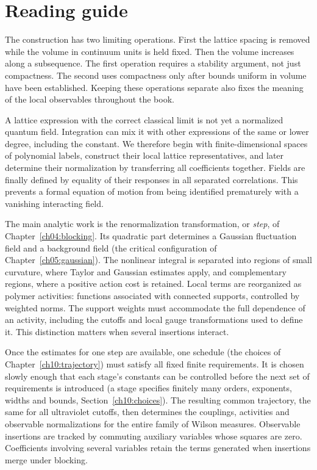 \chapter*{Reading guide}

The construction has two limiting operations. First the lattice spacing
is removed while the volume in continuum units is held fixed. Then the volume
increases along a subsequence. The first operation requires a stability
argument, not just compactness. The second uses compactness only after
bounds uniform in volume have been established. Keeping these operations
separate also fixes the meaning of the local observables throughout the
book.

A lattice expression with the correct classical limit is not yet a
normalized quantum field. Integration can mix it with other expressions
of the same or lower degree, including the constant. We therefore begin
with finite-dimensional spaces of polynomial labels, construct their
local lattice representatives, and later determine their normalization
by transferring all coefficients together. Fields are finally defined
by equality of their responses in all separated correlations. This prevents a
formal equation of motion from being identified prematurely with a
vanishing interacting field.

The main analytic work is the renormalization transformation, or \emph{step}, of Chapter~\ref{ch04:blocking}. Its quadratic part determines
a Gaussian fluctuation field and a background field (the critical configuration of Chapter~\ref{ch05:gaussian}). The nonlinear
integral is separated into regions of small curvature, where Taylor and
Gaussian estimates apply, and complementary regions, where a positive
action cost is retained. Local terms are reorganized as polymer
activities: functions associated with connected supports, controlled by
weighted norms. The support weights must accommodate the full dependence
of an activity, including the cutoffs and local gauge transformations used to
define it. This distinction matters when several insertions interact.

Once the estimates for one step are available, one schedule (the choices of Chapter~\ref{ch10:trajectory}) must satisfy
all fixed finite requirements. It is chosen slowly enough that each
stage's constants can be controlled before the next set of requirements
is introduced (a stage specifies finitely many orders, exponents, widths and bounds, Section~\ref{ch10:choices}). The resulting common trajectory, the same for all ultraviolet cutoffs, then determines the couplings,
activities and observable normalizations for the entire family of Wilson measures.
Observable insertions are tracked by commuting auxiliary variables whose
squares are zero. Coefficients involving several variables retain the
terms generated when insertions merge under blocking.

